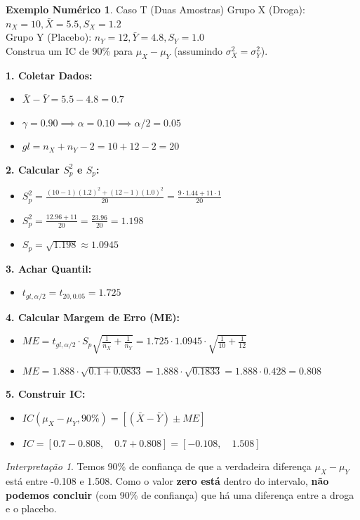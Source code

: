 \documentclass[12pt, a4paper]{article}
\theoremstyle{definition} %
\newtheorem{exemplo}{Exemplo Numérico}[section]
\theoremstyle{remark} %
\newtheorem{interpretacao}{Interpretação}[section]
\begin{document}
\begin{exemplo}{Caso T (Duas Amostras)}
    Grupo X (Droga): $n_X=10, \bar{X}=5.5, S_X=1.2$ \\
    Grupo Y (Placebo): $n_Y=12, \bar{Y}=4.8, S_Y=1.0$ \\
    Construa um IC de 90\% para $\mu_X - \mu_Y$ (assumindo $\sigma_X^2 = \sigma_Y^2$).

    \textbf{1. Coletar Dados:}
    \begin{itemize}
        \item $\bar{X} - \bar{Y} = 5.5 - 4.8 = 0.7$
        \item $\gamma = 0.90 \implies \alpha = 0.10 \implies \alpha/2 = 0.05$
        \item $gl = n_X + n_Y - 2 = 10 + 12 - 2 = 20$
    \end{itemize}
    \textbf{2. Calcular $S_p^2$ e $S_p$:}
    \begin{itemize}
        \item $S_p^2 = \frac{(10-1)(1.2)^2 + (12-1)(1.0)^2}{20} = \frac{9 \cdot 1.44 + 11 \cdot 1}{20}$
        \item $S_p^2 = \frac{12.96 + 11}{20} = \frac{23.96}{20} = 1.198$
        \item $S_p = \sqrt{1.198} \approx 1.0945$
    \end{itemize}
    \textbf{3. Achar Quantil:}
    \begin{itemize}
        \item $t_{gl, \alpha/2} = t_{20, 0.05} = 1.725$
    \end{itemize}
    \textbf{4. Calcular Margem de Erro (ME):}
    \begin{itemize}
        \item $ME = t_{gl, \alpha/2} \cdot S_p \sqrt{\frac{1}{n_X} + \frac{1}{n_Y}} = 1.725 \cdot 1.0945 \cdot \sqrt{\frac{1}{10} + \frac{1}{12}}$
        \item $ME = 1.888 \cdot \sqrt{0.1 + 0.0833} = 1.888 \cdot \sqrt{0.1833} = 1.888 \cdot 0.428 = 0.808$
    \end{itemize}
    \textbf{5. Construir IC:}
    \begin{itemize}
        \item $IC(\mu_X - \mu_Y, 90\%) = [ (\bar{X} - \bar{Y}) \pm ME ]$
        \item $IC = [0.7 - 0.808, \quad 0.7 + 0.808] = [-0.108, \quad 1.508]$
    \end{itemize}
    \begin{interpretacao}
        Temos 90\% de confiança de que a verdadeira diferença $\mu_X - \mu_Y$ está entre -0.108 e 1.508. Como o valor \textbf{zero está} dentro do intervalo, \textbf{não podemos concluir} (com 90\% de confiança) que há uma diferença entre a droga e o placebo.
    \end{interpretacao}
\end{exemplo}
\end{document}
